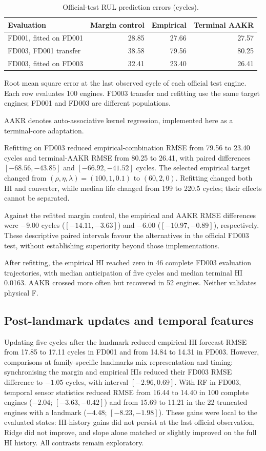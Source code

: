 \documentclass[12pt]{article}
\newcommand{\tablenotes}[1]{\par\smallskip\begin{minipage}{\linewidth}\footnotesize\raggedright\setlength{\parindent}{0pt}#1\end{minipage}}
\begin{document}
\begin{table}[htbp]
\centering
\caption{Official-test RUL prediction errors (cycles).}
\label{tab:hi-prognostic-comparison}
\footnotesize
\setlength{\tabcolsep}{3pt}
\begin{tabularx}{\linewidth}{@{}Xrrr@{}}
\toprule
Evaluation & Margin control & Empirical & Terminal AAKR \\
\midrule
FD001, fitted on FD001 & 28.85 & 27.66 & 27.57 \\
FD003, FD001 transfer & 38.58 & 79.56 & 80.25 \\
FD003, fitted on FD003 & 32.41 & 23.40 & 26.41 \\
\bottomrule
\end{tabularx}
\tablenotes{Root mean square error at the last observed cycle of each official test engine. Each row evaluates 100 engines. FD003 transfer and refitting use the same target engines; FD001 and FD003 are different populations.

AAKR denotes auto-associative kernel regression, implemented here as a terminal-core adaptation.}
\end{table}

Refitting on FD003 reduced empirical-combination RMSE from 79.56 to 23.40 cycles and terminal-AAKR RMSE from 80.25 to 26.41, with paired differences $[-68.56,-43.85]$ and $[-66.92,-41.52]$ cycles. The selected empirical target changed from $(\rho,\eta,\lambda)=(100,1,0.1)$ to $(60,2,0)$. Refitting changed both HI and converter, while median life changed from 199 to 220.5 cycles; their effects cannot be separated.

Against the refitted margin control, the empirical and AAKR RMSE differences were $-9.00$ cycles ($[-14.11,-3.63]$) and $-6.00$ ($[-10.97,-0.89]$), respectively. These descriptive paired intervals favour the alternatives in the official FD003 test, without establishing superiority beyond those implementations.

After refitting, the empirical HI reached zero in 46 complete FD003 evaluation trajectories, with median anticipation of five cycles and median terminal HI 0.0163. AAKR crossed more often but recovered in 52 engines. Neither validates physical F.

\subsection*{Post-landmark updates and temporal features}
Updating five cycles after the landmark reduced empirical-HI forecast RMSE from 17.85 to 17.11 cycles in FD001 and from 14.84 to 14.31 in FD003. However, comparisons at family-specific landmarks mix representation and timing: synchronising the margin and empirical HIs reduced their FD003 RMSE difference to $-1.05$ cycles, with interval $[-2.96,0.69]$. With RF in FD003, temporal sensor statistics reduced RMSE from 16.44 to 14.40 in 100 complete engines ($-2.04$; $[-3.63,-0.42]$) and from 15.69 to 11.21 in the 22 truncated engines with a landmark ($-4.48$; $[-8.23,-1.98]$). These gains were local to the evaluated states: HI-history gains did not persist at the last official observation, Ridge did not improve, and slope alone matched or slightly improved on the full HI history. All contrasts remain exploratory.
\end{document}
